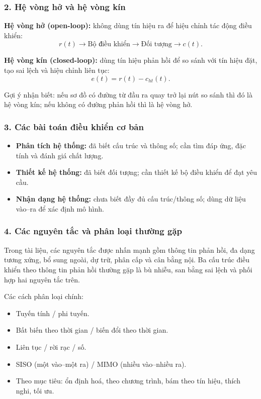 \subsubsection*{2. Hệ vòng hở và hệ vòng kín}

\textbf{Hệ vòng hở (open-loop):} không dùng tín hiệu ra để hiệu chỉnh tác động điều khiển:
\[
r(t)\longrightarrow \text{Bộ điều khiển}\longrightarrow \text{Đối tượng}\longrightarrow c(t).
\]

\textbf{Hệ vòng kín (closed-loop):} dùng tín hiệu phản hồi để so sánh với tín hiệu đặt,
tạo sai lệch và hiệu chỉnh liên tục:
\[
e(t)=r(t)-c_{ht}(t).
\]

Gợi ý nhận biết: nếu sơ đồ có đường từ đầu ra quay trở lại nút so sánh thì đó là
hệ vòng kín; nếu không có đường phản hồi thì là hệ vòng hở.

\subsubsection*{3. Các bài toán điều khiển cơ bản}

\begin{itemize}
  \item \textbf{Phân tích hệ thống:} đã biết cấu trúc và thông số; cần tìm đáp ứng, đặc tính và đánh giá chất lượng.
  \item \textbf{Thiết kế hệ thống:} đã biết đối tượng; cần thiết kế bộ điều khiển để đạt yêu cầu.
  \item \textbf{Nhận dạng hệ thống:} chưa biết đầy đủ cấu trúc/thông số; dùng dữ liệu vào--ra để xác định mô hình.
\end{itemize}

\subsubsection*{4. Các nguyên tắc và phân loại thường gặp}

Trong tài liệu, các nguyên tắc được nhấn mạnh gồm thông tin phản hồi, đa dạng tương xứng,
bổ sung ngoài, dự trữ, phân cấp và cân bằng nội. Ba cấu trúc điều khiển theo thông tin phản hồi
thường gặp là bù nhiễu, san bằng sai lệch và phối hợp hai nguyên tắc trên.

Các cách phân loại chính:
\begin{itemize}
  \item Tuyến tính / phi tuyến.
  \item Bất biến theo thời gian / biến đổi theo thời gian.
  \item Liên tục / rời rạc / số.
  \item SISO (một vào--một ra) / MIMO (nhiều vào--nhiều ra).
  \item Theo mục tiêu: ổn định hoá, theo chương trình, bám theo tín hiệu, thích nghi, tối ưu.
\end{itemize}

